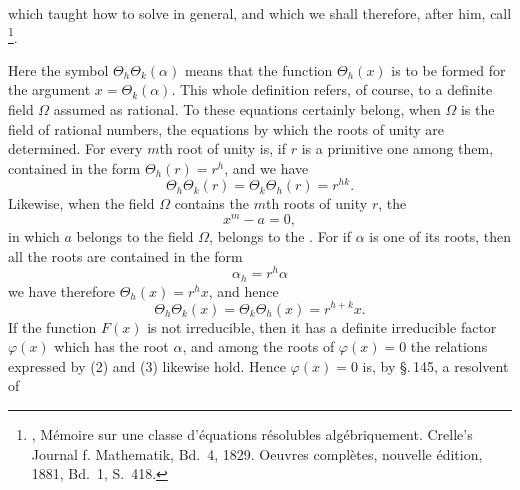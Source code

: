 
which  taught how to solve in general, and which we shall therefore, after him, call \footnote{, Mémoire sur une classe d'équations résolubles algébriquement. Crelle's Journal f. Mathematik, Bd.~4, 1829. Oeuvres complètes, nouvelle édition, 1881, Bd.~1, S.~418.}.


Here the symbol $\Theta_h\Theta_k(\alpha)$ means that the function $\Theta_h(x)$ is to be formed for the argument $x = \Theta_k(\alpha)$. This whole definition refers, of course, to a definite field $\Omega$ assumed as rational. To these equations certainly belong, when $\Omega$ is the field of rational numbers, the equations by which the roots of unity are determined. For every $m$th root of unity is, if $r$ is a primitive one among them, contained in the form $\Theta_h(r) = r^h$, and we have
\[
\Theta_h\Theta_k(r) = \Theta_k\Theta_h(r) = r^{hk}.
\]
Likewise, when the field $\Omega$ contains the $m$th roots of unity $r$, the 
\[
x^m - a = 0,
\]
in which $a$ belongs to the field $\Omega$, belongs to the . For if $\alpha$ is one of its roots, then all the roots are contained in the form
\[
\alpha_h = r^h\alpha
\]
we have therefore $\Theta_h(x) = r^hx$, and hence
\[
\Theta_h\Theta_k(x) = \Theta_k\Theta_h(x) = r^{h+k}x.
\]
If the function $F(x)$ is not irreducible, then it has a definite irreducible factor $\varphi(x)$ which has the root $\alpha$, and among the roots of $\varphi(x) = 0$ the relations expressed by (2) and (3) likewise hold. Hence $\varphi(x) = 0$ is, by \S.\,145, a  resolvent of
